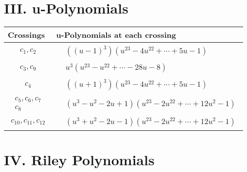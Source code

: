 \documentclass[1p]{elsarticle_modified}
\theoremstyle{definition}
\begin{document}
\newpage\renewcommand{\arraystretch}{1}
\centering \section*{ III. u-Polynomials}
\begin{tabular}{m{50pt}|m{274pt}}
Crossings & \hspace{64pt}u-Polynomials at each crossing \\
\hline $$\begin{aligned}c_{1},c_{2}\end{aligned}$$&$\begin{aligned}
&((u-1)^3)(u^{23}-4 u^{22}+\cdots+5 u-1)
\end{aligned}$\\
\hline $$\begin{aligned}c_{3},c_{9}\end{aligned}$$&$\begin{aligned}
&u^3(u^{23}- u^{22}+\cdots-28 u-8)
\end{aligned}$\\
\hline $$\begin{aligned}c_{4}\end{aligned}$$&$\begin{aligned}
&((u+1)^3)(u^{23}-4 u^{22}+\cdots+5 u-1)
\end{aligned}$\\
\hline $$\begin{aligned}c_{5},c_{6},c_{7}\\c_{8}\end{aligned}$$&$\begin{aligned}
&(u^3- u^2-2 u+1)(u^{23}-2 u^{22}+\cdots+12 u^2-1)
\end{aligned}$\\
\hline $$\begin{aligned}c_{10},c_{11},c_{12}\end{aligned}$$&$\begin{aligned}
&(u^3+u^2-2 u-1)(u^{23}-2 u^{22}+\cdots+12 u^2-1)
\end{aligned}$\\
\hline
\end{tabular}\newpage\renewcommand{\arraystretch}{1}
\centering \section*{ IV. Riley Polynomials}
\end{document}
